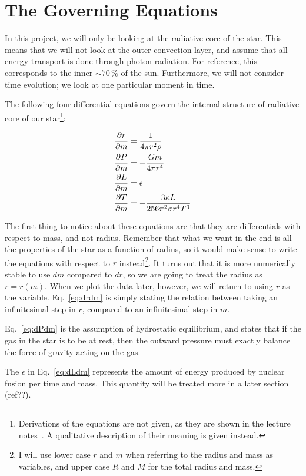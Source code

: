 \documentclass[11pt,twocolumn]{article}
\begin{document}
\section{The Governing Equations}
In this project, we will only be looking at the radiative core of the
star. This means that we will not look at the outer convection layer,
and assume that all energy transport is done through photon
radiation. For reference, this corresponds to the inner $\sim 70\,\%$ of the
sun. Furthermore, we will not consider time evolution; we look at one
particular moment in time. 

The following four differential equations govern the internal
structure of radiative core of our star\footnote{Derivations of the
  equations are not given, as they are shown in the lecture
  notes~\cite{lecture-notes}. A qualitative description of their
  meaning is given instead.}:

\begin{align}
  \frac{\partial r}{\partial m} &= \frac{ 1 }{ 4\pi r^2\rho }\label{eq:drdm}\\
  \frac{\partial P}{\partial m} &= - \frac{ Gm }{ 4\pi r^4 }\label{eq:dPdm}\\
  \frac{\partial L}{\partial m} &= \epsilon\label{eq:dLdm}\\
  \frac{\partial T}{\partial m} &= - \frac{ 3\kappa L }{ 256 \pi^2 \sigma r^4T^3 }\label{eq:dTdm}
\end{align}

The first thing to notice about these equations are that they are
differentials with respect to mass, and not radius. Remember that what
we want in the end is all the properties of the star as a function of
radius, so it would make sense to write the equations with respect to
$r$ instead\footnote{I will use lower case $r$ and $m$ when referring
  to the radius and mass as variables, and upper case $R$ and $M$ for
  the total radius and mass.}. It turns out that it is more numerically
stable to use $dm$ compared to $dr$, so we are going to treat the
radius as $r=r(m)$. When we plot the data later, however, we will
return to using $r$ as the variable. Eq.~\eqref{eq:drdm} is simply
stating the relation between taking an infinitesimal step in $r$,
compared to an infinitesimal step in $m$. 

Eq.~\eqref{eq:dPdm} is the assumption of hydrostatic equilibrium, and
states that if the gas in the star is to be at rest, then the outward
pressure must exactly balance the force of gravity acting on the gas. 

The $\epsilon$ in Eq.~\eqref{eq:dLdm} represents the amount of
energy produced by nuclear fusion per time and mass. This quantity
will be treated more in a later section (ref??).
\end{document}
